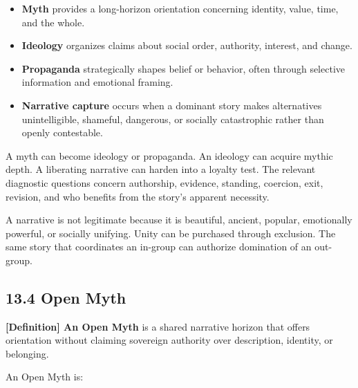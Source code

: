 \documentclass[
  11pt,
]{article}
\providecommand{\tightlist}{%
  \setlength{\itemsep}{0pt}\setlength{\parskip}{0pt}}
\begin{document}
\begin{itemize}
\tightlist
\item
  \textbf{Myth} provides a long-horizon orientation concerning identity,
  value, time, and the whole.
\item
  \textbf{Ideology} organizes claims about social order, authority,
  interest, and change.
\item
  \textbf{Propaganda} strategically shapes belief or behavior, often
  through selective information and emotional framing.
\item
  \textbf{Narrative capture} occurs when a dominant story makes
  alternatives unintelligible, shameful, dangerous, or socially
  catastrophic rather than openly contestable.
\end{itemize}

A myth can become ideology or propaganda. An ideology can acquire mythic
depth. A liberating narrative can harden into a loyalty test. The
relevant diagnostic questions concern authorship, evidence, standing,
coercion, exit, revision, and who benefits from the story's apparent
necessity.

A narrative is not legitimate because it is beautiful, ancient, popular,
emotionally powerful, or socially unifying. Unity can be purchased
through exclusion. The same story that coordinates an in-group can
authorize domination of an out-group.

\subsection{13.4 Open Myth}\label{open-myth}

\textbf{{[}Definition{]} An Open Myth} is a shared narrative horizon
that offers orientation without claiming sovereign authority over
description, identity, or belonging.

An Open Myth is:
\end{document}
